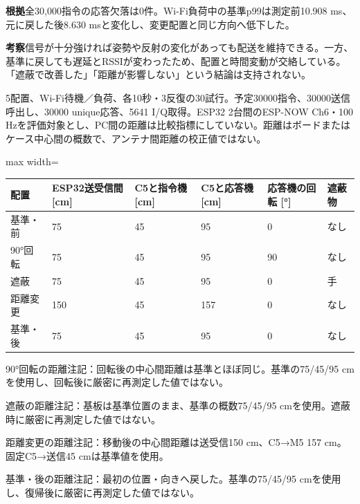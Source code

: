 \documentclass[a4paper,10pt]{ltjsarticle}
\begin{document}
\noindent\textbf{根拠}\quad 全30,000指令の応答欠落は0件。Wi-Fi負荷中の基準p99は測定前10.908 ms、元に戻した後8.630 msと変化し、変更配置と同じ方向へ低下した。

\noindent\textbf{考察}\quad 信号が十分強ければ姿勢や反射の変化があっても配送を維持できる。一方、基準に戻しても遅延とRSSIが変わったため、配置と時間変動が交絡している。「遮蔽で改善した」「距離が影響しない」という結論は支持されない。

5配置、Wi-Fi待機／負荷、各10秒・3反復の30試行。予定30000指令、30000送信呼出し、30000 unique応答、5641 I/Q取得。ESP32 2台間のESP-NOW Ch6・100 Hzを評価対象とし、PC間の距離は比較指標にしていない。距離はボードまたはケース中心間の概数で、アンテナ間距離の校正値ではない。

\begin{center}\small\begin{adjustbox}{max width=\linewidth}
\begin{tabular}{llllll}\toprule
配置 & ESP32送受信間 [cm] & C5と指令機 [cm] & C5と応答機 [cm] & 応答機の回転 [°] & 遮蔽物\\
\midrule
基準・前 & 75 & 45 & 95 & 0 & なし\\
90°回転 & 75 & 45 & 95 & 90 & なし\\
遮蔽 & 75 & 45 & 95 & 0 & 手\\
距離変更 & 150 & 45 & 157 & 0 & なし\\
基準・後 & 75 & 45 & 95 & 0 & なし\\
\bottomrule\end{tabular}\end{adjustbox}\end{center}

90°回転の距離注記：回転後の中心間距離は基準とほぼ同じ。基準の75/45/95 cmを使用し、回転後に厳密に再測定した値ではない。

遮蔽の距離注記：基板は基準位置のまま、基準の概数75/45/95 cmを使用。遮蔽時に厳密に再測定した値ではない。

距離変更の距離注記：移動後の中心間距離は送受信150 cm、C5→M5 157 cm。固定C5→送信45 cmは基準値を使用。

基準・後の距離注記：最初の位置・向きへ戻した。基準の75/45/95 cmを使用し、復帰後に厳密に再測定した値ではない。
\end{document}
